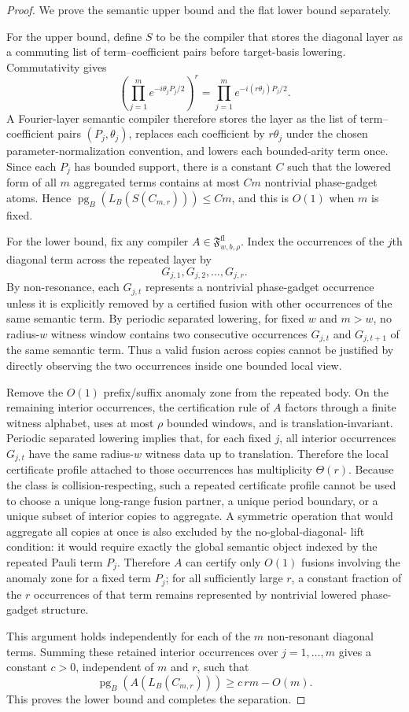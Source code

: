 \documentclass[11pt]{article}
\begin{document}
\begin{proof}
We prove the semantic upper bound and the flat lower bound separately.

For the upper bound, define $S$ to be the compiler that stores the diagonal
layer as a commuting list of term--coefficient pairs before target-basis
lowering. Commutativity gives
\[
\left(\prod_{j=1}^{m} e^{-i\theta_jP_j/2}\right)^r
=
\prod_{j=1}^{m} e^{-i(r\theta_j)P_j/2}.
\]
A Fourier-layer semantic compiler therefore stores the layer as the list of
term--coefficient pairs $(P_j,\theta_j)$, replaces each coefficient by
$r\theta_j$ under the chosen parameter-normalization convention, and lowers
each bounded-arity term once. Since each $P_j$ has bounded support, there is a
constant $C$ such that the lowered form of all $m$ aggregated terms contains at
most $Cm$ nontrivial phase-gadget atoms. Hence
$\operatorname{pg}_B(L_B(S(C_{m,r})))\le Cm$, and this is $O(1)$ when $m$ is
fixed.

For the lower bound, fix any compiler
$A\in\mathfrak{F}^{\mathrm{fl}}_{w,b,\rho}$. Index the occurrences of the
$j$th diagonal term across the repeated layer by
\[
G_{j,1},G_{j,2},\dots,G_{j,r}.
\]
By non-resonance, each $G_{j,t}$ represents a nontrivial
phase-gadget occurrence unless it is explicitly removed by a certified fusion
with other occurrences of the same semantic term. By periodic separated
lowering, for fixed $w$ and $m>w$, no radius-$w$ witness window contains two
consecutive occurrences $G_{j,t}$ and $G_{j,t+1}$ of the same semantic term.
Thus a valid fusion across copies cannot be justified by directly observing
the two occurrences inside one bounded local view.

Remove the $O(1)$ prefix/suffix anomaly zone from the repeated body. On the
remaining interior occurrences, the certification rule of
$A$ factors through a finite witness alphabet, uses at most $\rho$ bounded
windows, and is translation-invariant. Periodic separated lowering implies
that, for each fixed $j$, all interior occurrences $G_{j,t}$ have the same
radius-$w$ witness data up to translation. Therefore the local certificate
profile attached to those occurrences has multiplicity $\Theta(r)$. Because the
class is collision-respecting, such a repeated certificate profile cannot be
used to choose a unique long-range fusion partner, a unique period boundary, or
a unique subset of interior copies to aggregate. A symmetric operation that
would aggregate all copies at once is also excluded by the no-global-diagonal-
lift condition: it would require exactly the global semantic object indexed by
the repeated Pauli term $P_j$. Therefore $A$ can certify only $O(1)$ fusions
involving the anomaly zone for a fixed term $P_j$; for all sufficiently large
$r$, a constant fraction of the $r$ occurrences of that term remains
represented by nontrivial lowered phase-gadget structure.

This argument holds independently for each of the $m$ non-resonant diagonal
terms. Summing these retained interior occurrences over $j=1,\dots,m$ gives a
constant $c>0$, independent of $m$ and $r$, such that
\[
\operatorname{pg}_B(A(L_B(C_{m,r}))) \ge c\,rm - O(m).
\]
This proves the lower bound and completes the separation.
\end{proof}
\end{document}
